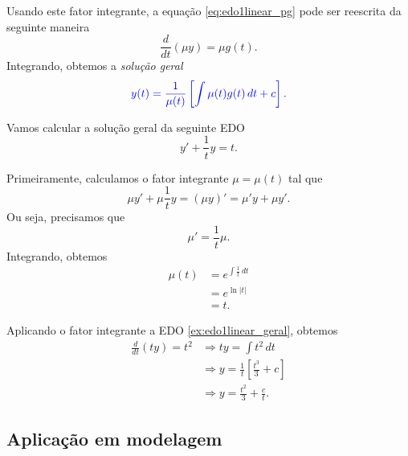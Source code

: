 Usando este fator integrante, a equação \eqref{eq:edo1linear_pg} pode ser reescrita da seguinte maneira
\begin{equation}
  \frac{d}{dt}\left(\mu y\right) = \mu g(t).
\end{equation}
Integrando, obtemos a \emph{solução geral}
\begin{equation}
  \color{blue}{y(t) = \frac{1}{\mu(t)}\left[\int \mu(t) g(t)\,dt + c\right].}
\end{equation}

\begin{ex}
  Vamos calcular a solução geral da seguinte EDO
  \begin{equation}\label{ex:edo1linear_geral}
    y' + \frac{1}{t}y = t.
  \end{equation}

  Primeiramente, calculamos o fator integrante $\mu = \mu(t)$ tal que
  \begin{equation}
    \mu y' + \mu \frac{1}{t} y = (\mu y)' = \mu'y + \mu y'.
  \end{equation}
  Ou seja, precisamos que
  \begin{equation}
    \mu' = \frac{1}{t}\mu.
  \end{equation}
  Integrando, obtemos
  \begin{align}
    \mu(t) &= e^{\int \frac{1}{t}\,dt} \\
           &= e^{\ln|t|} \\
           &= t.
  \end{align}

  Aplicando o fator integrante a EDO \eqref{ex:edo1linear_geral}, obtemos
  \begin{align}
    \frac{d}{dt}\left(t y\right) = t^2 &\Rightarrow ty = \int t^2\,dt \\
                                       &\Rightarrow y = \frac{1}{t}\left[\frac{t^3}{3} + c\right] \\
                                       &\Rightarrow y = \frac{t^2}{3} + \frac{c}{t}.
  \end{align}
\end{ex}

\subsection{Aplicação em modelagem}

